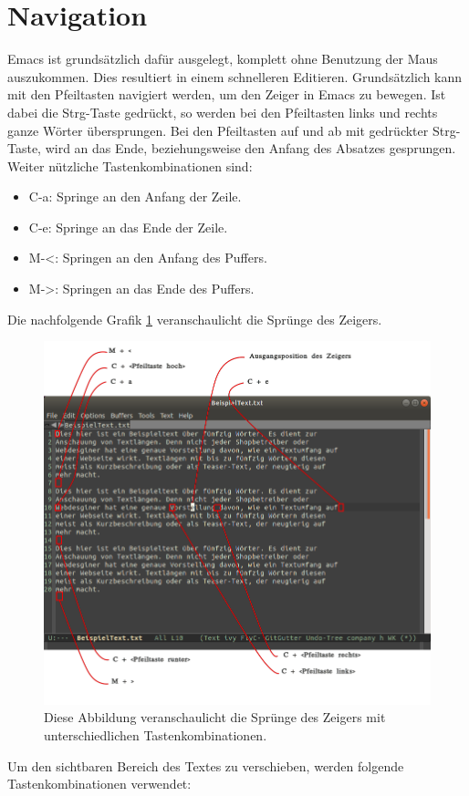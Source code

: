\section{Navigation}
Emacs ist grundsätzlich dafür ausgelegt, komplett ohne Benutzung der
Maus auszukommen. Dies resultiert in einem schnelleren
Editieren. Grundsätzlich kann mit den Pfeiltasten navigiert werden, um
den Zeiger in Emacs zu bewegen. Ist dabei die Strg-Taste gedrückt, so
werden bei den Pfeiltasten links und rechts ganze Wörter
übersprungen. Bei den Pfeiltasten auf und ab mit gedrückter
Strg-Taste, wird an das Ende, beziehungsweise den Anfang des Absatzes
gesprungen. Weiter nützliche Tastenkombinationen sind:
\begin{itemize}
\item C-a: Springe an den Anfang der Zeile.
\item C-e: Springe an das Ende der Zeile.
\item M-<: Springen an den Anfang des Puffers.
\item M->: Springen an das Ende des Puffers.
\end{itemize}
Die nachfolgende Grafik \ref{fig:Navigation} veranschaulicht die
Sprünge des Zeigers.\\

\begin{figure}[h]
  \centering
  \includegraphics[width=.95\textwidth]{./images/Grundlagen/Navigation.png}
  \caption{\label{fig:Navigation} Diese Abbildung veranschaulicht die
    Sprünge des Zeigers mit unterschiedlichen Tastenkombinationen.}
\end{figure}
Um den sichtbaren Bereich des Textes zu verschieben, werden folgende
Tastenkombinationen verwendet:

